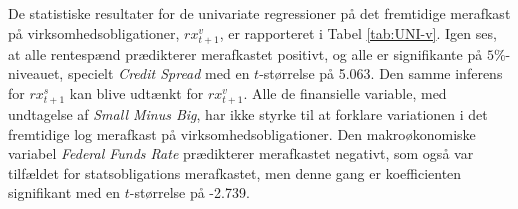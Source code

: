\documentclass[
  a4paper,
  oneside]{memoir}
\begin{document}
\begin{table}[H]
\begin{threeparttable}
\begin{tablenotes}
\end{tablenotes}
\end{threeparttable}
\end{table}

De statistiske resultater for de univariate regressioner på det fremtidige merafkast på virksomhedsobligationer, \(rx_{t+1}^v\), er rapporteret i Tabel \ref{tab:UNI-v}. Igen ses, at alle rentespænd prædikterer merafkastet positivt, og alle er signifikante på \(5\%\)-niveauet, specielt \emph{Credit Spread} med en \(t\)-størrelse på 5.063. Den samme inferens for \(rx_{t+1}^s\) kan blive udtænkt for \(rx_{t+1}^v\). Alle de finansielle variable, med undtagelse af \emph{Small Minus Big}, har ikke styrke til at forklare variationen i det fremtidige log merafkast på virksomhedsobligationer. Den makroøkonomiske variabel \emph{Federal Funds Rate} prædikterer merafkastet negativt, som også var tilfældet for statsobligations merafkastet, men denne gang er koefficienten signifikant med en \(t\)-størrelse på -2.739.
\end{document}
